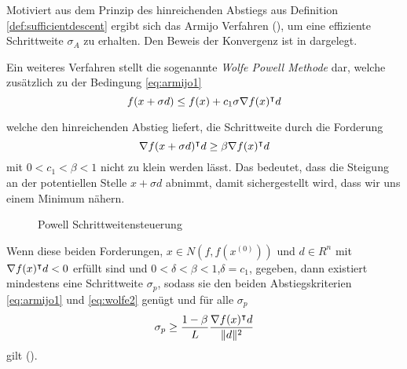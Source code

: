 Motiviert aus dem Prinzip des hinreichenden Abstiegs aus Definition \ref{def:sufficientdescent} ergibt sich das Armijo Verfahren (\cite[Verfahren 4.5.4]{alt2002nichtlineare}), um eine effiziente Schrittweite $\sigma_A$ zu erhalten.   
Den Beweis der Konvergenz ist in  \cite[Satz 4.5.5]{alt2002nichtlineare} dargelegt.

Ein weiteres Verfahren stellt die sogenannte \textit{Wolfe Powell Methode} dar, welche zusätzlich zu der Bedingung \eqref{eq:armijo1}
\begin{equation}
 f(x+\sigma d) \leq f(x) + c_1\sigma \nabla f(x)^\intercal d
\end{equation}

welche den hinreichenden Abstieg liefert, die Schrittweite durch die Forderung
\begin{equation}
\label{eq:wolfe2}
 \nabla f(x+\sigma d)^\intercal d\geq \beta \nabla f(x)^\intercal d
\end{equation}
mit $0<c_1<\beta<1$ nicht zu klein werden lässt. Das bedeutet, dass die Steigung an der potentiellen Stelle $x+\sigma d$ abnimmt, damit sichergestellt wird, dass wir uns einem Minimum nähern. 

\begin{figure}
\centering

\caption{Powell Schrittweitensteuerung}
\label{fig:powell}
\end{figure}
Wenn diese beiden Forderungen, $x\in N(f,f(x^{(0)}))$ und $d\in R^n$ mit $\nabla f(x)^\intercal d<0$ erfüllt sind und $0<\delta<\beta<1$,$\delta =c_1$, gegeben, dann existiert mindestens eine Schrittweite $\sigma_p$, sodass sie den beiden Abstiegskriterien \eqref{eq:armijo1} und \eqref{eq:wolfe2} genügt und für alle $\sigma_p$
\[
 \sigma_p \geq \frac{1-\beta}{L}\frac{\nabla f(x)^\intercal d}{\|d\|^2}
\]
gilt (\cite[Satz 4.5.8.]{alt2002nichtlineare}).

